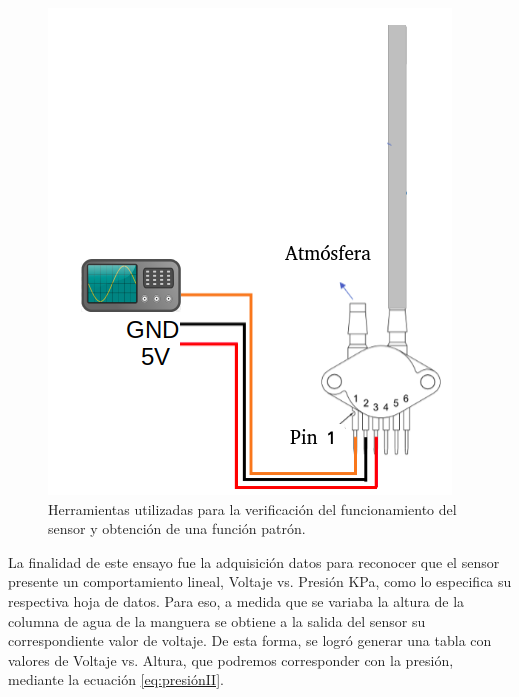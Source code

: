 \begin{figure}[htpb]
	\centering
	\includegraphics[scale=.50]{./Figures/PruebasDelSensor-FuncionPatron.png}
	\caption{Herramientas utilizadas para la verificación del funcionamiento del sensor y obtención de una función patrón. }
\label{fig:Pruebas del sensor-Funcion patron.png}
\end{figure}

La finalidad de este ensayo fue la adquisición datos para reconocer que el sensor presente un comportamiento lineal, Voltaje vs. Presión KPa, como lo especifica su respectiva hoja de datos. Para eso, a medida que se variaba	la altura de la columna de agua de la manguera se obtiene a la salida del sensor su correspondiente valor de voltaje. De esta forma, se logró generar una tabla con valores de Voltaje vs. Altura, que podremos corresponder con la presión, mediante la ecuación \ref{eq:presiónII}.
    
